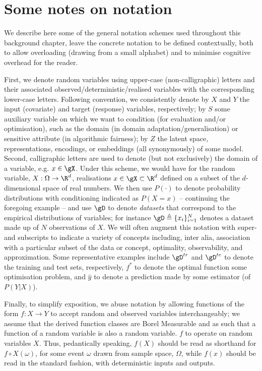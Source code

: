 \section{Some notes on notation}\label{sec:notation}
We describe here some of the general notation schemes used throughout this background chapter,
leave the concrete notation to be defined contextually, both to allow overloading (drawing from a
small alphabet) and to minimise cognitive overhead for the reader.

%
First, we denote random variables using upper-case (non-calligraphic) letters and their associated
observed/deterministic/realised variables with the corresponding lower-case letters.
%
Following convention, we consistently denote by \(X\) and \(Y\) the input (covariate) and
target (response) variables, respectively; by \(S\) some auxiliary variable on which we want to
condition (for evaluation and/or optimisation), such as the domain (in domain
adaptation/generalisation) or sensitive attribute (in algorithmic fairness); by \(Z\) the latent
space, representations, encodings, or embeddings (all synonymously) of some model.
%
Second, calligraphic letters are used to denote (but not exclusively) the domain of a variable,
e.g. \(x \in \gX \).
%
Under this scheme, we would have for the random variable, \(X: \Omega \to \R^d \), realisations \(x
\in \gX \subset \R^d \) defined on a subset of the \(d\)-dimensional space of real numbers.
%
We then use \(P(\cdot)\) to denote probability distributions with conditioning indicated as
\(P(X=x)\) -- continuing the foregoing example -- and use \(\gD\) to denote \emph{datasets} that
correspond to the empirical distributions of variables; for instance \(\gD \triangleq
\{x_i\}_{i=1}^N \) denotes a dataset made up of \(N\) observations of \(X\).
%
We will often augment this notation with super- and subscripts to indicate a variety of concepts
including, inter alia, association with a particular subset of the data or concept, optimality,
observability, and approximation.
%
Some representative examples include \(\gD^{tr}\) and \(\gD^{te}\) to denote the training and test
sets, respectively, \(f^\ast\) to denote the optimal function \wrt{} some optimisation problem, and
\(\hat{y}\) to denote a prediction made by some estimator (of \(P(Y|X)\)).
%

%
Finally, to simplify exposition, we abuse notation by allowing functions of the form \(f: X \to Y
\) to accept random and observed variables interchangeably; we assume that the derived function
classes are Borel Measurable and as such that a function of a random variable is also a random
variable. \(f\) to operate on random variables \(X\).
Thus, pedantically speaking, \( f(X) \) should be read as shorthand for \( f \circ X(\omega) \),
for some event \( \omega \) drawn from sample space, \( \Omega \), while \( f(x) \) should be read
in the standard fashion, with deterministic inputs and outputs.

